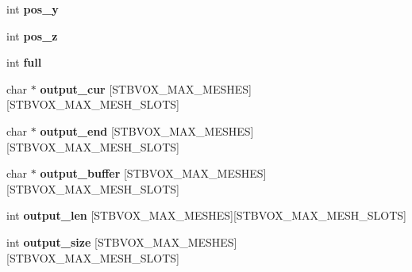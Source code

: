 \begin{DoxyCompactItemize}
\item 
int {\bfseries pos\+\_\+y}\hypertarget{structstbvox__mesh__maker_ac745953189e4ac2ec1e194ef8a0ad964}{}\label{structstbvox__mesh__maker_ac745953189e4ac2ec1e194ef8a0ad964}

\item 
int {\bfseries pos\+\_\+z}\hypertarget{structstbvox__mesh__maker_a16888c233a1afcc2a4029de1eb7ce0ce}{}\label{structstbvox__mesh__maker_a16888c233a1afcc2a4029de1eb7ce0ce}

\item 
int {\bfseries full}\hypertarget{structstbvox__mesh__maker_a0a18ec3f76b06cf3a00e2e880758009b}{}\label{structstbvox__mesh__maker_a0a18ec3f76b06cf3a00e2e880758009b}

\item 
char $\ast$ {\bfseries output\+\_\+cur} \mbox{[}S\+T\+B\+V\+O\+X\+\_\+\+M\+A\+X\+\_\+\+M\+E\+S\+H\+ES\mbox{]}\mbox{[}S\+T\+B\+V\+O\+X\+\_\+\+M\+A\+X\+\_\+\+M\+E\+S\+H\+\_\+\+S\+L\+O\+TS\mbox{]}\hypertarget{structstbvox__mesh__maker_a8397a3e08406b7aad15bf6b0b5d83250}{}\label{structstbvox__mesh__maker_a8397a3e08406b7aad15bf6b0b5d83250}

\item 
char $\ast$ {\bfseries output\+\_\+end} \mbox{[}S\+T\+B\+V\+O\+X\+\_\+\+M\+A\+X\+\_\+\+M\+E\+S\+H\+ES\mbox{]}\mbox{[}S\+T\+B\+V\+O\+X\+\_\+\+M\+A\+X\+\_\+\+M\+E\+S\+H\+\_\+\+S\+L\+O\+TS\mbox{]}\hypertarget{structstbvox__mesh__maker_a01517b5a5dd1666856403db6be3782c0}{}\label{structstbvox__mesh__maker_a01517b5a5dd1666856403db6be3782c0}

\item 
char $\ast$ {\bfseries output\+\_\+buffer} \mbox{[}S\+T\+B\+V\+O\+X\+\_\+\+M\+A\+X\+\_\+\+M\+E\+S\+H\+ES\mbox{]}\mbox{[}S\+T\+B\+V\+O\+X\+\_\+\+M\+A\+X\+\_\+\+M\+E\+S\+H\+\_\+\+S\+L\+O\+TS\mbox{]}\hypertarget{structstbvox__mesh__maker_a82eec37bbd791851d622b5adaa12a4d7}{}\label{structstbvox__mesh__maker_a82eec37bbd791851d622b5adaa12a4d7}

\item 
int {\bfseries output\+\_\+len} \mbox{[}S\+T\+B\+V\+O\+X\+\_\+\+M\+A\+X\+\_\+\+M\+E\+S\+H\+ES\mbox{]}\mbox{[}S\+T\+B\+V\+O\+X\+\_\+\+M\+A\+X\+\_\+\+M\+E\+S\+H\+\_\+\+S\+L\+O\+TS\mbox{]}\hypertarget{structstbvox__mesh__maker_a6c005f5e2a0def07053b66c8283933c2}{}\label{structstbvox__mesh__maker_a6c005f5e2a0def07053b66c8283933c2}

\item 
int {\bfseries output\+\_\+size} \mbox{[}S\+T\+B\+V\+O\+X\+\_\+\+M\+A\+X\+\_\+\+M\+E\+S\+H\+ES\mbox{]}\mbox{[}S\+T\+B\+V\+O\+X\+\_\+\+M\+A\+X\+\_\+\+M\+E\+S\+H\+\_\+\+S\+L\+O\+TS\mbox{]}\hypertarget{structstbvox__mesh__maker_a13339add8c408aaddc61201f248f02c0}{}\label{structstbvox__mesh__maker_a13339add8c408aaddc61201f248f02c0}


\end{DoxyCompactItemize}
